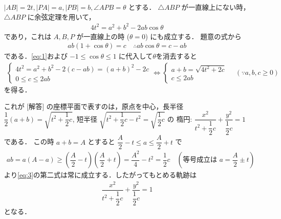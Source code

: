 \documentclass[../../main.tex]{subfiles}
\begin{document}
$|AB| = 2t, |PA| = a, |PB| = b, \angle APB = \theta$ とする．
$\triangle ABP$ が一直線上にない時，$\triangle ABP$ に余弦定理を用いて，
\begin{align}
  4t^2 = a^2 + b^2 - 2ab \cos \theta \label{eq:1}
\end{align}
であり，これは $A, B, P$ が一直線上の時 ($\theta = 0$) にも成立する．
題意の式から
\begin{align}
  ab (1 + \cos \theta) = c
  \quad\therefore
  ab \cos \theta = c - ab \label{eq:2}
\end{align}
である．\cref{eq:1}および $-1 \le \cos \theta \le 1$ に代入して$\theta$を消去すると
\begin{align}
  \begin{cases}
    4t^2 = a^2 + b^2 - 2(c - ab) = (a + b)^2 - 2c \\
    0 \le c \le 2ab
  \end{cases}
  \iff
  \begin{cases}
    a + b = \sqrt{4t^2 + 2c}  \\
    c \le 2ab
  \end{cases} \quad (\because a, b, c \ge 0)  \label{eq:3}
\end{align}
を得る．

これが [解答] の座標平面で表すのは，原点を中心，長半径 $\dfrac{1}{2}(a+b) = \sqrt{t^2 + \dfrac{1}{2} c}$, 短半径 $\sqrt{t^2 + \dfrac{1}{2} c - t^2} = \sqrt{\dfrac{1}{2} c}$ の
楕円: $\dfrac{x^2}{t^2 + \dfrac{1}{2} c} + \dfrac{y^2}{\dfrac{1}{2} c} = 1$ である．
この時 $a+b=A$ とすると $\dfrac{A}{2} - t \le a \le \dfrac{A}{2} + t$ で
\begin{align}
  ab = a(A - a) \ge \left( \dfrac{A}{2} - t \right) \left( \dfrac{A}{2} + t \right) = \dfrac{A^2}{4} - t^2 = \dfrac{1}{2} c \quad (\text{等号成立は } a = \dfrac{A}{2} \pm t)
\end{align}
より\cref{eq:3}の第二式は常に成立する．したがってもとめる軌跡は
\begin{align}
  \dfrac{x^2}{t^2 + \dfrac{1}{2} c} + \dfrac{y^2}{\dfrac{1}{2} c} = 1
\end{align}
となる．
\end{document}
